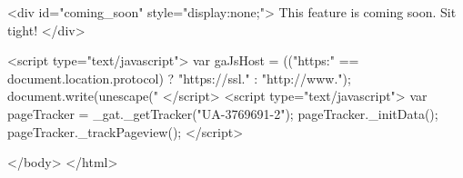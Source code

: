     <div id="coming_soon" style="display:none;">
      This feature is coming soon.  Sit tight!
    </div>

    
        <script type="text/javascript">
    var gaJsHost = (("https:" == document.location.protocol) ? "https://ssl." : "http://www.");
    document.write(unescape("%
    </script>
    <script type="text/javascript">
    var pageTracker = _gat._getTracker("UA-3769691-2");
    pageTracker._initData();
    pageTracker._trackPageview();
    </script>

    
  </body>
</html>

